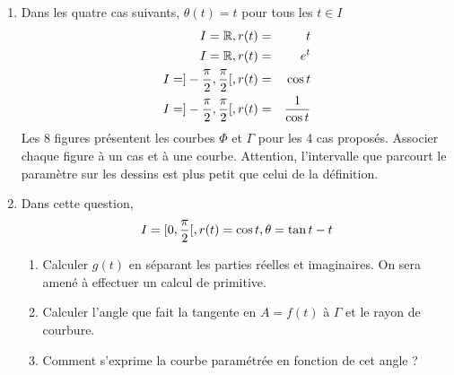 \begin{enumerate}
\item Dans les quatre cas suivants, $\theta(t)=t$ pour tous les $t\in I$
\begin{eqnarray}
I=\R,\medskip  r(t)&=&t \\
I=\R,\medskip  r(t)&=&e^t\\
I=]-\frac{\pi}{2},\frac{\pi}{2}[, \medskip r(t)&=&\cos t \\
I=]-\frac{\pi}{2},\frac{\pi}{2}[, \medskip r(t)&=&\frac{1}{\cos t}
\end{eqnarray}
Les 8 figures présentent les courbes $\Phi$ et $\Gamma$ pour les 4 cas proposés. Associer chaque figure à un cas et à une courbe. Attention, l'intervalle que parcourt le paramètre sur les dessins est plus petit que celui de la définition.

\item Dans cette question,
\[I=[0,\frac{\pi}{2}[, \medskip r(t) = \cos t , \medskip \theta=\tan t -t\]
\begin{enumerate}
\item Calculer $g(t)$ en séparant les parties réelles et imaginaires. On sera amené à effectuer un calcul de primitive.
\item Calculer l'angle que fait la tangente en $A=f(t)$ à $\Gamma$ et le rayon de courbure.
\item Comment s'exprime la courbe paramétrée en fonction de cet angle ?
\end{enumerate}  
\end{enumerate}

